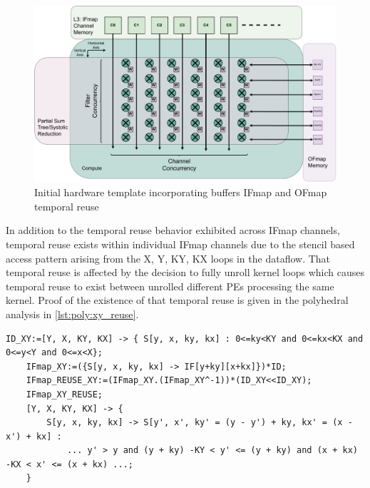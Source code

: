 \begin{figure}[]
    \centering
    \includegraphics[scale=0.4]{fig/reuse_illus.pdf}
    \caption{Initial hardware template incorporating buffers IFmap and OFmap temporal reuse}
    \label{fig:reuse_illus}
\end{figure}

In addition to the temporal reuse behavior exhibited across IFmap channels,
temporal reuse exists within individual IFmap channels due to the stencil based
access pattern arising from the X, Y, KY, KX loops in the dataflow. That
temporal reuse is affected by the decision to fully unroll kernel loops which
causes temporal reuse to exist between unrolled different PEs processing the
same kernel. Proof of the existence of that temporal reuse is given in the polyhedral analysis in
\autoref{lst:poly:xy_reuse}. 

\begin{lstlisting}[caption=Analysis of IFmap channel reuse, label={lst:poly:xy_reuse}]
    ID_XY:=[Y, X, KY, KX] -> { S[y, x, ky, kx] : 0<=ky<KY and 0<=kx<KX and 0<=y<Y and 0<=x<X};
    IFmap_XY:=({S[y, x, ky, kx] -> IF[y+ky][x+kx]})*ID;
    IFmap_REUSE_XY:=(IFmap_XY.(IFmap_XY^-1))*(ID_XY<<ID_XY);
    IFmap_XY_REUSE;
    [Y, X, KY, KX] -> { 
        S[y, x, ky, kx] -> S[y', x', ky' = (y - y') + ky, kx' = (x - x') + kx] : 
            ... y' > y and (y + ky) -KY < y' <= (y + ky) and (x + kx) -KX < x' <= (x + kx) ...;
    }
\end{lstlisting}

